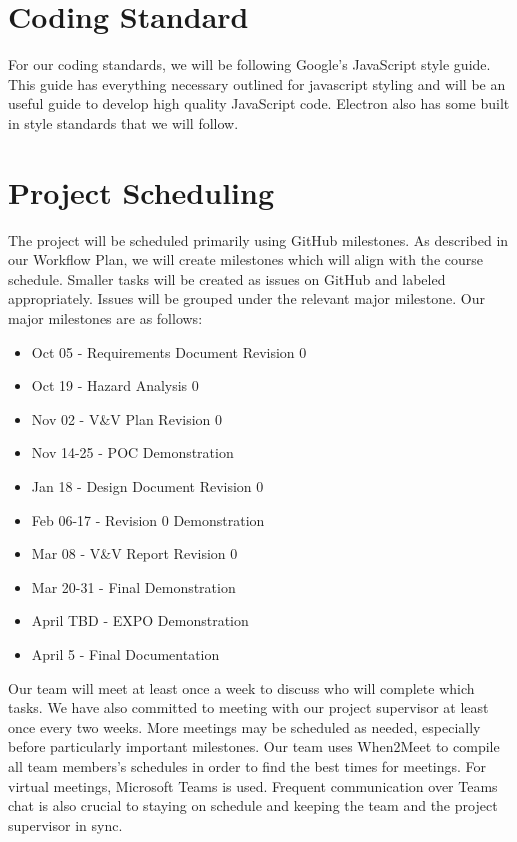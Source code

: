 \documentclass{article}
\begin{document}
\section{Coding Standard}
  
For our coding standards, we will be following Google's JavaScript style guide. This guide has everything
necessary outlined for javascript styling and will be an useful guide to develop high quality JavaScript code. Electron also has some built in 
style standards that we will follow.

\section{Project Scheduling}

\noindent The project will be scheduled primarily using GitHub milestones. As described in our Workflow Plan, we will create milestones which will align with the course schedule. Smaller tasks will be created as issues on GitHub and labeled appropriately. Issues will be grouped under the relevant major milestone. Our major milestones are as follows:

\begin{itemize}
  \item Oct 05 - Requirements Document Revision 0
  \item Oct 19 - Hazard Analysis 0 
  \item Nov 02 - V\&V Plan Revision 0
  \item Nov 14-25 - POC Demonstration
  \item Jan 18 - Design Document Revision 0
  \item Feb 06-17 - Revision 0 Demonstration
  \item Mar 08 - V\&V Report Revision 0
  \item Mar 20-31 - Final Demonstration
  \item April TBD - EXPO Demonstration
  \item April 5 - Final Documentation \\
\end{itemize}
\noindent Our team will meet at least once a week to discuss who will complete which tasks. We have also committed to meeting with our project supervisor at least once every two weeks. More meetings may be scheduled as needed, especially before particularly important milestones. Our team uses When2Meet to compile all team members's schedules in order to find the best times for meetings. For virtual meetings, Microsoft Teams is used. Frequent communication over Teams chat is also crucial to staying on schedule and keeping the team and the project supervisor in sync. \\
\end{document}
